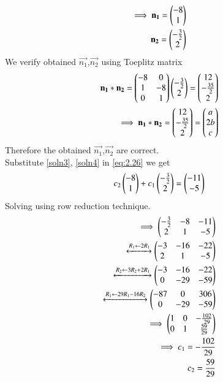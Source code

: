 \documentclass[journal,12pt,twocolumn]{IEEEtran}
\begin{document}
\begin{align}
    \implies\mathbf{n_1}=\begin{pmatrix}-8\\1\end{pmatrix}\label{soln3}\\
    \mathbf{n_2}=\begin{pmatrix}-\frac{3}{2}\\2\end{pmatrix}\label{soln4}
\end{align}
We verify obtained $\vec{n_1}$,$\vec{n_2}$ using Toeplitz matrix
\begin{align}
    \mathbf{n_1}*\mathbf{n_2}=\begin{pmatrix}-8 & 0\\1 & -8\\0 & 1\end{pmatrix}\begin{pmatrix}-\frac{3}{2} \\ 2\end{pmatrix}=\begin{pmatrix}12\\-\frac{35}{2}\\2\end{pmatrix}\\
    \implies\mathbf{n_1}*\mathbf{n_2}=\begin{pmatrix}12\\-\frac{35}{2}\\2\end{pmatrix}=\begin{pmatrix}a\\ 2b \\ c\end{pmatrix}
\end{align}
Therefore the obtained $\vec{n_1}$,$\vec{n_2}$ are correct.\\
Substitute \eqref{soln3}, \eqref{soln4} in \eqref{eq:2.26} we get 
\begin{align}
    c_2\begin{pmatrix}-8\\1\end{pmatrix}+c_1\begin{pmatrix}-\frac{3}{2}\\2\end{pmatrix}=\begin{pmatrix} -11\\ -5\end{pmatrix}
\end{align}
Solving using row reduction technique.
\begin{align}
    \implies\begin{pmatrix}-\frac{3}{2} & -8 & -11\\2 & 1 & -5\end{pmatrix}\\
    \xleftrightarrow[]{R_1\leftarrow 2R_1}\begin{pmatrix}-3 & -16 & -22\\2 & 1 & -5\end{pmatrix}\\
    \xleftrightarrow[]{R_2\leftarrow 3R_2+2R_1}\begin{pmatrix}-3 & -16 & -22\\0 & -29 & -59\end{pmatrix}\\
    \xleftrightarrow[]{R_1\leftarrow 29R_1-16R_2}\begin{pmatrix}-87 & 0 & 306\\0 & -29 & -59\end{pmatrix}\\
    \implies\begin{pmatrix}1 & 0 & -\frac{102}{29}\\0 & 1 & \frac{59}{29}\end{pmatrix}\\
    \implies c_1=-\frac{102}{29}\label{c3}\\
    c_2=\frac{59}{29}\label{c4}
\end{align}
\end{document}
